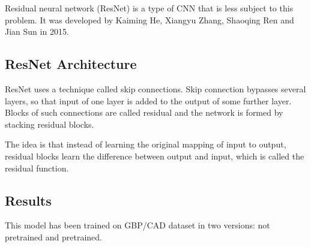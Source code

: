 Residual neural network (ResNet) is a type of CNN that is less subject to this problem.
It was developed by Kaiming He, Xiangyu Zhang, Shaoqing Ren and Jian Sun in 2015.

\subsection{ResNet Architecture}
ResNet uses a technique called skip connections. Skip connection bypasses several layers, so
that input of one layer is added to the output of some further layer. Blocks of such connections
are called residual and the network is formed by stacking residual blocks.

The idea is that instead of learning the original mapping of input to output, residual blocks
learn the difference between output and input, which is called the residual function.

\subsection{Results}

This model has been trained on GBP/CAD dataset in two versions: not pretrained and pretrained.





















